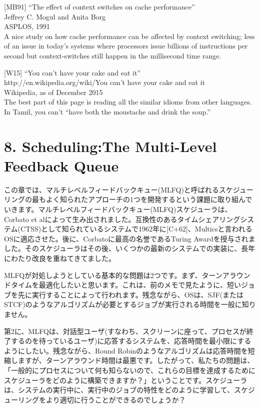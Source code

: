 {[}MB91{]} ``The effect of context switches on cache performance''\\
Jeffrey C. Mogul and Anita Borg\\
ASPLOS, 1991\\
A nice study on how cache performance can be affected by context
switching; less of an issue in today's systems where processors issue
billions of instructions per second but context-switches still happen in
the millisecond time range.

{[}W15{]} ``You can't have your cake and eat it''\\
http://en.wikipedia.org/wiki/You can't have your cake and eat it\\
Wikipedia, as of December 2015\\
The best part of this page is reading all the similar idioms from other
languages. In Tamil, you can't ``have both the moustache and drink the
soup.''

\hypertarget{schedulingthe-multi-level-feedback-queue}{%
\section*{8. Scheduling:The Multi-Level Feedback
Queue}\label{schedulingthe-multi-level-feedback-queue}}

この章では、マルチレベルフィードバックキュー(MLFQ)と呼ばれるスケジューリングの最もよく知られたアプローチの1つを開発するという課題に取り組んでいきます。マルチレベルフィードバックキュー(MLFQ)スケジューラは、Corbato
et
alによって生み出されました。互換性のあるタイムシェアリングシステム(CTSS)として知られているシステムで1962年に{[}C+62{]}、Multicsと言われるOSに適応させた。後に、Corbatoに最高の名誉であるTuring
Awardを授与されました。そのスケジューラはその後、いくつかの最新のシステムでの実装に、長年にわたり改良を重ねてきてました。

MLFQが対処しようとしている基本的な問題は2つです。まず、ターンアラウンドタイムを最適化したいと思います。これは、前のメモで見たように、短いジョブを先に実行することによって行われます。残念ながら、OSは、SJF(またはSTCF)のようなアルゴリズムが必要とするジョブが実行される時間を一般に知りません。

第2に、MLFQは、対話型ユーザ(すなわち、スクリーンに座って、プロセスが終了するのを待っているユーザ)に応答するシステムを、応答時間を最小限にするようにしたい。残念ながら、Round
Robinのようなアルゴリズムは応答時間を短縮しますが、ターンアラウンド時間は最悪です。したがって、私たちの問題は、「一般的にプロセスについて何も知らないので、これらの目標を達成するためにスケジューラをどのように構築できますか？」ということです。スケジューラは、システムの実行中に、実行中のジョブの特性をどのように学習して、スケジューリングをより適切に行うことができるのでしょうか？

